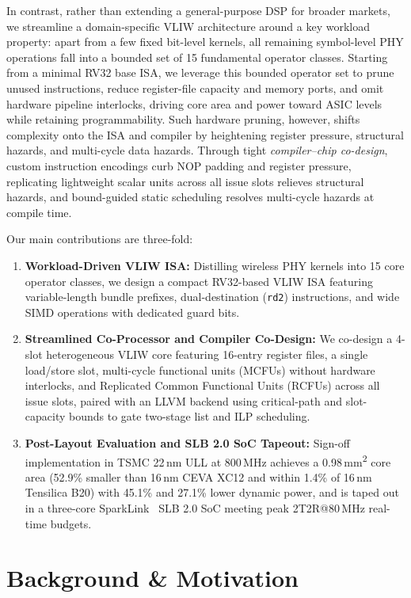 \documentclass[9pt,conference]{IEEEtran}
\begin{document}
In contrast, rather than extending a general-purpose DSP for broader markets, we streamline a domain-specific VLIW architecture around a key workload property: apart from a few fixed bit-level kernels, all remaining symbol-level PHY operations fall into a bounded set of 15 fundamental operator classes. Starting from a minimal RV32 base ISA, we leverage this bounded operator set to prune unused instructions, reduce register-file capacity and memory ports, and omit hardware pipeline interlocks, driving core area and power toward ASIC levels while retaining programmability. Such hardware pruning, however, shifts complexity onto the ISA and compiler by heightening register pressure, structural hazards, and multi-cycle data hazards. Through tight \textit{compiler--chip co-design}, custom instruction encodings curb NOP padding and register pressure, replicating lightweight scalar units across all issue slots relieves structural hazards, and bound-guided static scheduling resolves multi-cycle hazards at compile time.

Our main contributions are three-fold:
\begin{enumerate}
    \item \textbf{Workload-Driven VLIW ISA:} Distilling wireless PHY kernels into 15 core operator classes, we design a compact RV32-based VLIW ISA featuring variable-length bundle prefixes, dual-destination (\texttt{rd2}) instructions, and wide SIMD operations with dedicated guard bits.
    \item \textbf{Streamlined Co-Processor and Compiler Co-Design:} We co-design a 4-slot heterogeneous VLIW core featuring 16-entry register files, a single load/store slot, multi-cycle functional units (MCFUs) without hardware interlocks, and Replicated Common Functional Units (RCFUs) across all issue slots, paired with an LLVM backend using critical-path and slot-capacity bounds to gate two-stage list and ILP scheduling.
    \item \textbf{Post-Layout Evaluation and SLB 2.0 SoC Tapeout:} Sign-off implementation in TSMC 22\,nm ULL at 800\,MHz achieves a 0.98\,mm\textsuperscript{2} core area (52.9\% smaller than 16\,nm CEVA XC12 and within 1.4\% of 16\,nm Tensilica B20) with 45.1\% and 27.1\% lower dynamic power, and is taped out in a three-core SparkLink~\cite{gao2023sparklink} SLB 2.0 SoC meeting peak 2T2R@80\,MHz real-time budgets.
\end{enumerate}

\section{Background \& Motivation}
\end{document}
